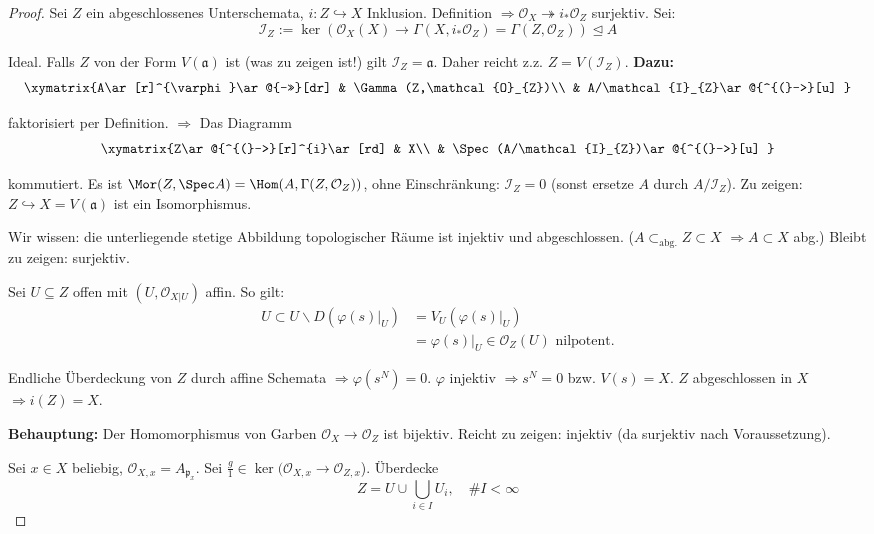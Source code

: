\begin{proof}
  Sei $Z$ ein abgeschlossenes Unterschemata, $i:Z\hookrightarrow X$
  Inklusion. Definition $\Longrightarrow\mathcal{O}_{X}\twoheadrightarrow i_{\ast}\mathcal{O}_{Z}$
  surjektiv. Sei:
  \[
    \mathcal{I}_{Z}:=\ker(\mathcal{O}_{X}(X)\rightarrow\Gamma(X,i_{\ast}\mathcal{O}_{Z})=\Gamma(Z,\mathcal{O}_{Z}))\unlhd A
  \]

  Ideal. Falls $Z$ von der Form $V(\mathfrak{a})$ ist (was zu zeigen
  ist!) gilt $\mathcal{I}_{Z}=\mathfrak{a}$. Daher reicht z.z. $Z=V(\mathcal{I}_{Z})$.
  \textbf{Dazu:
    \[
      \xymatrix{A\ar[r]^{\varphi}\ar@{->>}[dr] & \Gamma(Z,\mathcal{O}_{Z})\\
        & A/\mathcal{I}_{Z}\ar@{^{(}->}[u]
      }
    \]
  }

  faktorisiert per Definition. $\Longrightarrow$ Das Diagramm
  \[
    \xymatrix{Z\ar@{^{(}->}[r]^{i}\ar[rd] & X\\
      & \Spec(A/\mathcal{I}_{Z})\ar@{^{(}->}[u]
    }
  \]

  kommutiert. Es ist $\Mor(Z,\Spec A)=\Hom(A,\Gamma(Z,\mathcal{O}_{Z}))$,
  ohne Einschränkung: $\mathcal{I}_{Z}=0$ (sonst ersetze $A$ durch
  $A/\mathcal{I}_{Z}$). Zu zeigen: $Z\hookrightarrow X=V(\mathfrak{a})$
  ist ein Isomorphismus.

  Wir wissen: die unterliegende stetige Abbildung topologischer Räume
  ist injektiv und abgeschlossen. ($A\subset_{\text{abg.}}Z\subset X$
  $\Longrightarrow A\subset X$ abg.) Bleibt zu zeigen: surjektiv.

  Sei $U\subseteq Z$ offen mit $(U,\mathcal{O}_{X|U})$ affin. So gilt:
  \begin{align*}
    U\subset U\backslash D(\varphi(s)|_{U}) & =V_{U}(\varphi(s)|_{U})\\
                                            & =\varphi(s)|_{U}\in\mathcal{O}_{Z}(U)\text{ nilpotent}.
  \end{align*}

  Endliche Überdeckung von $Z$ durch affine Schemata $\Longrightarrow\varphi(s^{N})=0$.
  $\varphi$ injektiv $\Longrightarrow s^{N}=0$ bzw. $V(s)=X$. $Z$
  abgeschlossen in $X$ $\Longrightarrow i(Z)=X$.

  \textbf{Behauptung: }Der Homomorphismus von Garben $\mathcal{O}_{X}\rightarrow\mathcal{O}_{Z}$
  ist bijektiv. Reicht zu zeigen: injektiv (da surjektiv nach Voraussetzung).

  Sei $x\in X$ beliebig, $\mathcal{O}_{X,x}=A_{\mathfrak{p}_{x}}$.
  Sei $\frac{g}{1}\in\ker(\mathcal{O}_{X,x}\rightarrow\mathcal{O}_{Z,x}$).
  Überdecke
  \[
    Z=U\cup\bigcup_{i\in I}U_{i},\quad\#I<\infty
  \]


\end{proof}
